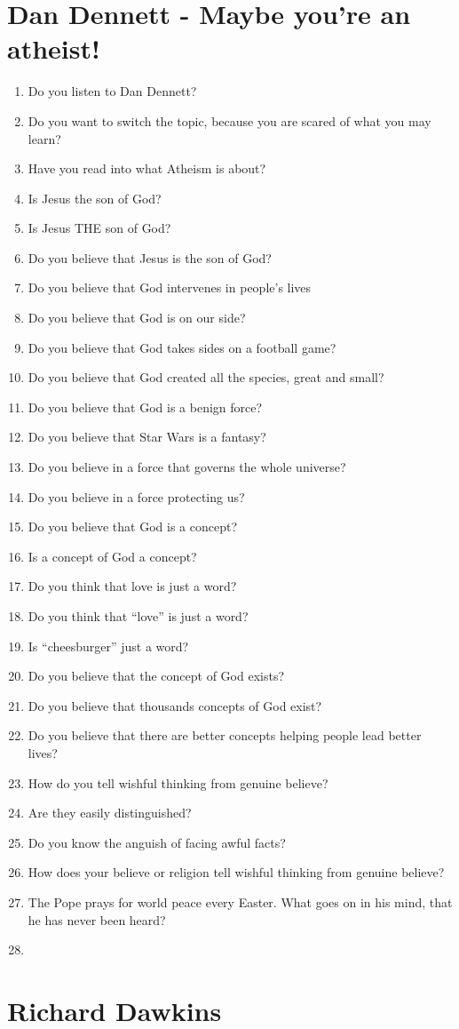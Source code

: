 \documentclass[10pt,a4paper]{article}
\begin{document}
\section{Dan Dennett - Maybe you're an atheist!}
\begin{enumerate}
	\item Do you listen to Dan Dennett?
	\item Do you want to switch the topic, because you are scared of what you may learn?
	\item Have you read into what Atheism is about?
	\item Is Jesus the son of God?
	\item Is Jesus THE son of God?
	\item Do you believe that Jesus is the son of God?
	\item Do you believe that God intervenes in people's lives
	\item Do you believe that God is on our side? 
	\item Do you believe that God takes sides on a football game?
	\item Do you believe that God created all the species, great and small?
	\item Do you believe that God is a benign force?
	\item Do you believe that Star Wars is a fantasy?
	\item Do you believe in a force that governs the whole universe?
	\item Do you believe in a force protecting us?
	\item Do you believe that God is a concept?
	\item Is a concept of God a concept?
	\item Do you think that love is just a word?
	\item Do you think that \enquote{love} is just a word?
	\item Is \enquote{cheesburger} just a word?
	\item Do you believe that the concept of God exists?
	\item Do you believe that thousands concepts of God exist?
	\item Do you believe that there are better concepts helping people lead better lives?
	\item How do you tell wishful thinking from genuine believe?
	\item Are they easily distinguished?
	\item Do you know the anguish of facing awful facts?
	\item How does your believe or religion tell wishful thinking from genuine believe?
	\item The Pope prays for world peace every Easter. What goes on in his mind, that he has never been heard?
	\item 
\end{enumerate}

\section{Richard Dawkins}
\end{document}
